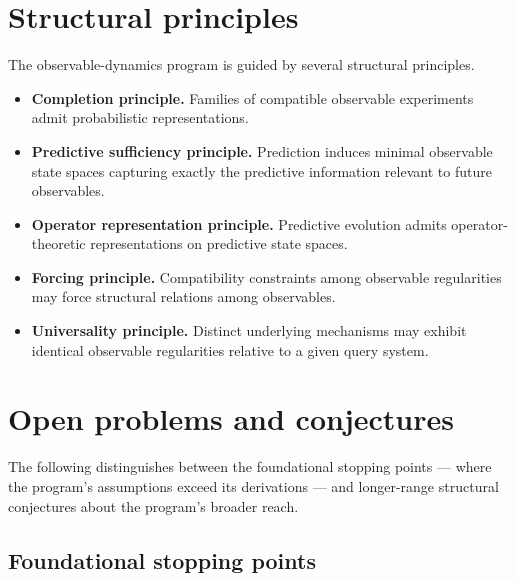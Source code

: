 \documentclass[11pt]{article}
\begin{document}

\section{Structural principles}

The observable-dynamics program is guided by several structural
principles.

\begin{itemize}

\item \textbf{Completion principle.}
Families of compatible observable experiments admit probabilistic
representations.

\item \textbf{Predictive sufficiency principle.}
Prediction induces minimal observable state spaces capturing exactly
the predictive information relevant to future observables.

\item \textbf{Operator representation principle.}
Predictive evolution admits operator-theoretic representations on
predictive state spaces.

\item \textbf{Forcing principle.}
Compatibility constraints among observable regularities may force
structural relations among observables.

\item \textbf{Universality principle.}
Distinct underlying mechanisms may exhibit identical observable
regularities relative to a given query system.

\end{itemize}



\section{Open problems and conjectures}

The following distinguishes between the foundational stopping points
--- where the program's assumptions exceed its derivations --- and
longer-range structural conjectures about the program's broader reach.

\subsection*{Foundational stopping points}
\end{document}
